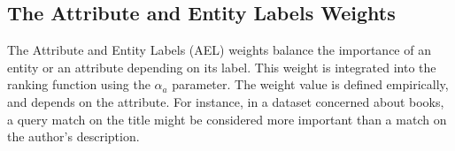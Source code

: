 \subsection{The Attribute and Entity Labels Weights}
\label{sec:att-subj-w}

The Attribute and Entity Labels (AEL) weights balance the importance of an entity or an attribute depending on its label. This weight is integrated into the ranking function using the $\alpha_a$ parameter.
The weight value is defined empirically, and depends on the attribute. For instance, in a dataset concerned about books, a query match on the title might be considered more important than a match on the author's description.
